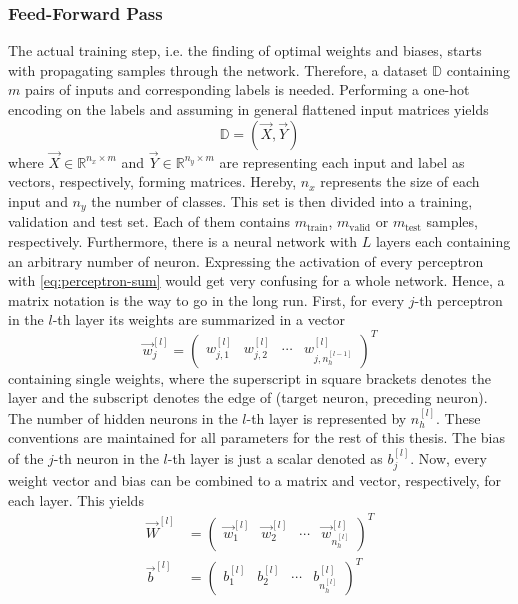 \subsubsection{Feed-Forward Pass}
\label{sec:training-forward-pass}
The actual training step, i.e. the finding of optimal weights and biases, starts with propagating samples through the network.
Therefore, a dataset $\mathbb{D}$ containing $m$ pairs of inputs and corresponding labels is needed.
Performing a one-hot encoding on the labels and assuming in general flattened input matrices yields
\begin{equation}
	\label{eq:dataset-one-hot}
	\mathbb{D} = \left( \vec{X} , \vec{Y} \right)
\end{equation}
where $\vec{X} \in \mathbb{R}^{n_x \times m}$ and $\vec{Y} \in \mathbb{R}^{n_y \times m}$ are representing each input and label as vectors, respectively, forming matrices.
Hereby, $n_x$ represents the size of each input and $n_y$ the number of classes.
This set is then divided into a training, validation and test set.
Each of them contains $m_{\text{train}}$, $m_{\text{valid}}$ or $m_{\text{test}}$ samples, respectively.
Furthermore, there is a neural network with $L$ layers each containing an arbitrary number of neuron.
Expressing the activation of every perceptron with \eqref{eq:perceptron-sum} would get very confusing for a whole network.
Hence, a matrix notation is the way to go in the long run.
First, for every $j$-th perceptron in the $l$-th layer its weights are summarized in a vector
\begin{equation}
	\label{eq:weights-vector}
	\vec{w}^{[l]}_j =
	\begin{pmatrix}
		w^{[l]}_{j,1} & w^{[l]}_{j,2} & \cdots & w^{[l]}_{j,n^{[l-1]}_h}
	\end{pmatrix}^T
\end{equation}
containing single weights, where the superscript in square brackets denotes the layer and the subscript denotes the edge of (target neuron, preceding neuron).
The number of hidden neurons in the $l$-th layer is represented by $n^{[l]}_h$.
These conventions are maintained for all parameters for the rest of this thesis.
The bias of the $j$-th neuron in the $l$-th layer is just a scalar denoted as $b^{[l]}_j$. 
Now, every weight vector and bias can be combined to a matrix and vector, respectively, for each layer.
This yields
\begin{subequations}
\label{eq:parameters}
	\begin{align}
		\vec{W}^{[l]} &=
		\begin{pmatrix}
			\vec{w}^{[l]}_1 & \vec{w}^{[l]}_2 & \cdots & \vec{w}^{[l]}_{n^{[l]}_h}
		\end{pmatrix}^T
		\label{eq:weights}
		\\
		\vec{b}^{[l]} &=
			\begin{pmatrix}
				b^{[l]}_1 & b^{[l]}_2 & \cdots & b^{[l]}_{n^{[l]}_h}
			\end{pmatrix}^T
		\label{eq:biases}
	\end{align}
\end{subequations}
